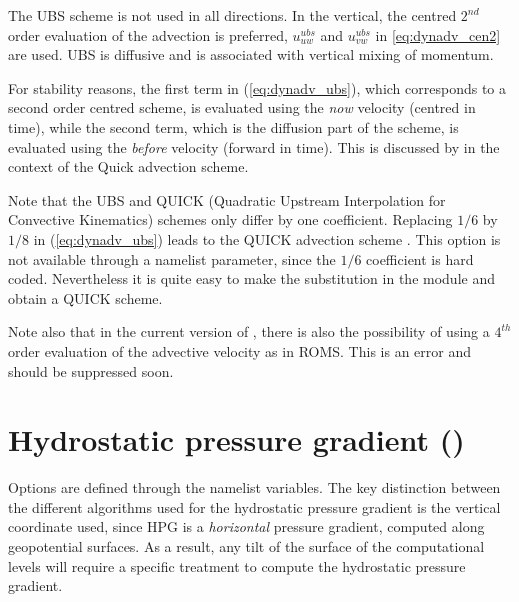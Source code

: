 \documentclass[../main/NEMO_manual]{subfiles}
\begin{document}
The UBS scheme is not used in all directions.
In the vertical, the centred $2^{nd}$ order evaluation of the advection is preferred, \ie $u_{uw}^{ubs}$ and
$u_{vw}^{ubs}$ in \autoref{eq:dynadv_cen2} are used.
UBS is diffusive and is associated with vertical mixing of momentum. 

For stability reasons, the first term in (\autoref{eq:dynadv_ubs}),
which corresponds to a second order centred scheme, is evaluated using the \textit{now} velocity (centred in time),
while the second term, which is the diffusion part of the scheme,
is evaluated using the \textit{before} velocity (forward in time).
This is discussed by \citet{Webb_al_JAOT98} in the context of the Quick advection scheme.

Note that the UBS and QUICK (Quadratic Upstream Interpolation for Convective Kinematics) schemes only differ by
one coefficient.
Replacing $1/6$ by $1/8$ in (\autoref{eq:dynadv_ubs}) leads to the QUICK advection scheme \citep{Webb_al_JAOT98}.
This option is not available through a namelist parameter, since the $1/6$ coefficient is hard coded.
Nevertheless it is quite easy to make the substitution in the  module and obtain a QUICK scheme.

Note also that in the current version of ,
there is also the possibility of using a $4^{th}$ order evaluation of the advective velocity as in ROMS.
This is an error and should be suppressed soon.

\section{Hydrostatic pressure gradient (\protect{})}
\label{sec:DYN_hpg}


Options are defined through the  namelist variables.
The key distinction between the different algorithms used for
the hydrostatic pressure gradient is the vertical coordinate used,
since HPG is a \emph{horizontal} pressure gradient, \ie computed along geopotential surfaces.
As a result, any tilt of the surface of the computational levels will require a specific treatment to
compute the hydrostatic pressure gradient.
\end{document}
